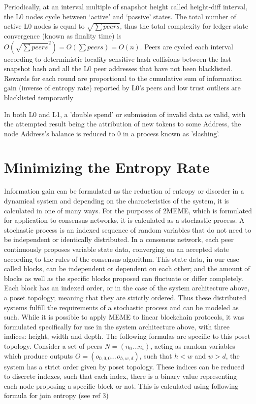 \documentclass{article}
\begin{document}
Periodically, at an interval multiple of snapshot height called height-diff interval, the L0 nodes cycle between ‘active’ and ‘passive’ states. The total number of active L0 nodes is equal to $\sqrt{\sum peers}$, thus the total complexity for ledger state convergence (known as finality time) is $O(\sqrt{\sum peers}^2) = O(\sum peers)  = O(n)$. Peers are cycled each interval according to deterministic locality sensitive hash collisions between the last snapshot hash and all the L0 peer addresses that have not been blacklisted. Rewards for each round are proportional to the cumulative sum of information gain (inverse of entropy rate) reported by L0’s peers and low trust outliers are blacklisted temporarily 

In both L0 and L1, a 'double spend' or submission of invalid data as valid, with the attempted result being the attribution of new tokens to some Address, the node Address's balance is reduced to 0 in a process known as 'slashing'.

\section{Minimizing the Entropy Rate}
Information gain can be formulated as the reduction of entropy or disorder in a dynamical system and depending on the characteristics of the system, it is calculated in one of many ways. For the purposes of 2MEME, which is formulated for application to consensus networks, it is calculated as a stochastic process.
	A stochastic process is an indexed sequence of random variables that do not need to be independent or identically distributed. In a consensus network, each peer continuously proposes variable state data, converging on an accepted state according to the rules of the consensus algorithm. This state data, in our case called blocks, can be independent or dependent on each other; and the amount of blocks as well as the specific blocks proposed can fluctuate or differ completely. Each block has an indexed order, or in the case of the system architecture above, a poset topology; meaning that they are strictly ordered. Thus these distributed systems fulfill the requirements of a stochastic process and can be modeled as such. While it is possible to apply MEME to linear blockchain protocols, it was formulated specifically for use in the system architecture above, with three indices: height, width and depth. The following formulas are specific to this poset topology.
	Consider a set of peers $N = (n_0 …n_i)$, acting as random variables which produce outputs $O = (o_{0,0,0} … o_{h,w,d})$, such that $h<w$ and $w>d$, the system has a strict order given by poset topology. These indices can be reduced to discrete indexes, such that each index, there is a binary value representing each node proposing a specific block or not. This is calculated using following formula for join entropy (see ref 3) 
	
\end{document}
